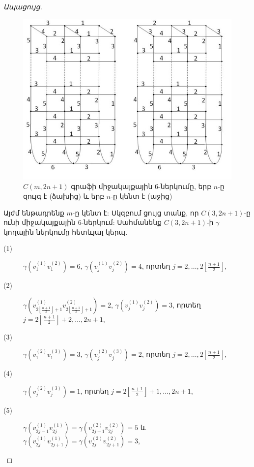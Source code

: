 \begin{proof}[Ապացույց]
\begin{figure}[b!]
\centering
\includegraphics[width=145mm]{figures/cylinders.jpg}
\caption{$C(m,2n+1)$ գրաֆի միջակայքային 6-ներկումը, երբ $n$-ը զույգ է (ձախից) և երբ $n$-ը կենտ է (աջից)}
\label{cylinders}
\end{figure}

Այժմ ենթադրենք $m$-ը կենտ է: Սկզբում ցույց տանք, որ $C(3,2n+1)$-ը ունի միջակայքային $6$-ներկում: Սահմանենք $C(3,2n+1)$-ի $\gamma$ կողային ներկումը հետևյալ կերպ.
\begin{description}
\item[(1)]
$\gamma\left(v_{1}^{(1)}v_{1}^{(2)}\right)=6$, $\gamma\left(v_{j}^{(1)}v_{j}^{(2)}\right)=4$, որտեղ $j=2,\ldots,2\left\lfloor\frac{n+1}{2}\right\rfloor$,
\item[(2)]
$\gamma\left(v_{2\left\lfloor\frac{n+1}{2}\right\rfloor+1}^{(1)}v_{2\left\lfloor\frac{n+1}{2}\right\rfloor+1}^{(2)}\right)=2$, $\gamma\left(v_{j}^{(1)}v_{j}^{(2)}\right)=3$, որտեղ  $j=2\left\lfloor\frac{n+1}{2}\right\rfloor+2,\ldots,2n+1$,
\item[(3)]
$\gamma\left(v_{1}^{(2)}v_{1}^{(3)}\right)=3$, $\gamma\left(v_{j}^{(2)}v_{j}^{(3)}\right)=2$, որտեղ $j=2,\ldots,2\left\lfloor\frac{n+1}{2}\right\rfloor$,
\item[(4)]
$\gamma\left(v_{j}^{(2)}v_{j}^{(3)}\right)=1$, որտեղ $j=2\left\lfloor\frac{n+1}{2}\right\rfloor+1,\ldots,2n+1$,
\item[(5)]
$\gamma\left(v_{2j-1}^{(1)}v_{2j}^{(1)}\right)=\gamma\left(v_{2j-1}^{(2)}v_{2j}^{(2)}\right)=5$
և
$\gamma\left(v_{2j}^{(1)}v_{2j+1}^{(1)}\right)=\gamma\left(v_{2j}^{(2)}v_{2j+1}^{(2)}\right)=3$,


\end{description}
\end{proof}
